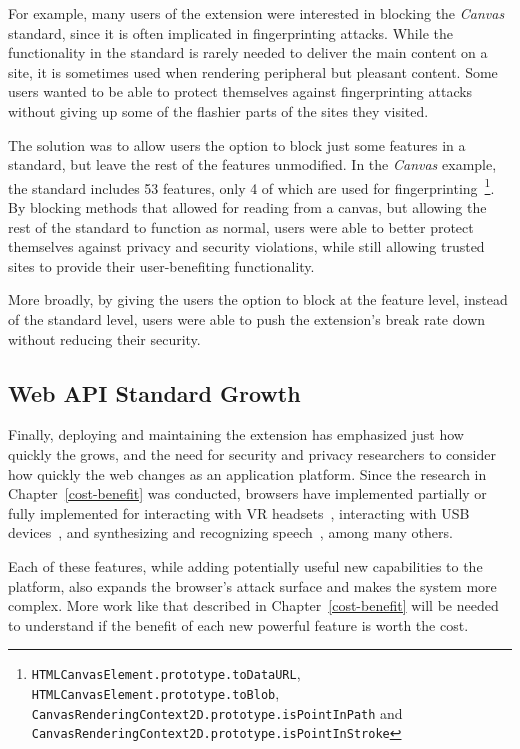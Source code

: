 For example, many users of the extension were interested in blocking the
\textit{Canvas} standard, since it is often implicated in fingerprinting attacks.
While the functionality in the standard is rarely needed to deliver the
main content on a site, it is sometimes used when rendering peripheral but
pleasant content.  Some users wanted to be able to protect themselves against
fingerprinting attacks without giving up some of the flashier parts of the sites
they visited.

The solution was to allow users the option to block
just some features in a standard, but leave the rest of the features
unmodified.  In the \textit{Canvas} example, the standard includes 53 features,
only 4 of which are used for fingerprinting~\footnote{%
\texttt{HTMLCanvasElement.prototype.toDataURL},
\texttt{HTMLCanvasElement.prototype.toBlob},
\texttt{CanvasRenderingContext2D.prototype.isPointInPath} and
\texttt{CanvasRenderingContext2D.prototype.isPointInStroke}}.  By blocking
methods that allowed for reading from a canvas, but allowing the rest of the
standard to function as normal, users were able to better protect themselves against
privacy and security violations, while still allowing trusted sites to provide
their user-benefiting functionality.

More broadly, by giving the users the option to block at the feature level,
instead of the standard level, users were able to push the extension's break
rate down without reducing their security.


\subsection{Web API Standard Growth}
Finally, deploying and maintaining the extension has emphasized just how
quickly the \WAPI grows, and the need for security and privacy
researchers to consider how quickly the web changes as an application
platform.  Since the research in Chapter~\ref{cost-benefit} was conducted,
browsers have implemented partially or fully implemented \WASs for interacting
with VR headsets~\cite{webvrstandard}, interacting with USB
devices~\cite{webusbstandard}, and synthesizing and recognizing
speech~\cite{speechtandard}, among many others.

Each of these features, while adding potentially useful new capabilities to the
platform, also expands the browser's attack surface and makes the system more
complex.  More work like that described in Chapter~\ref{cost-benefit} will be
needed to understand if the benefit of each new powerful feature is worth the
cost.
